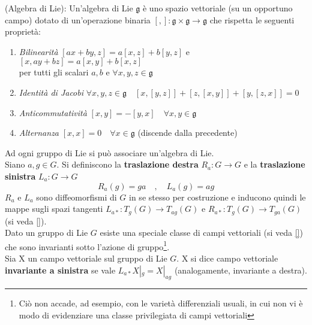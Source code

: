 \begin{definition}{(Algebra di Lie):}\label{def:LieAlgebra}
   Un'algebra di Lie $\mathfrak{g}$ è uno spazio vettoriale (su un opportuno campo)
   dotato di un'operazione binaria $[,] : \mathfrak{g} \times \mathfrak{g} \to \mathfrak{g}$
   che rispetta le seguenti proprietà:
   \begin{enumerate}
       \item \emph{Bilinearità} \quad $[ax+by,z] = a[x,z]+b[y,z]$ \quad e \quad
          $[x,ay+bz] = a[x,y] + b[x,z]$ \\
          per tutti gli scalari $a,b$ e $\forall x,y,z \in \mathfrak{g}$
       \item \emph{Identità di Jacobi} \quad $\forall x,y,z \in \mathfrak{g} \quad
          [x,[y,z]] + [z,[x,y]] + [y,[z,x]] = 0$
       \item \emph{Anticommutatività} \quad $[x,y] = -[y,x] \quad
          \forall x,y \in \mathfrak{g} $
       \item \emph{Alternanza} \quad $[x,x]=0 \quad \forall x \in \mathfrak{g}$ \quad
          (discende dalla precedente)
   \end{enumerate}
\end{definition}


Ad ogni gruppo di Lie si può associare un'algebra di Lie.\\

Siano $a,g \in G$. Si definiscono la \textbf{traslazione destra} $R_a : G \to G$
e la \textbf{traslazione sinistra} $L_a : G \to G$
$$
   R_a(g) = ga \quad,\quad L_a(g) = ag
$$
$R_a$ e $L_a$ sono diffeomorfismi di $G$ in se stesso per costruzione e inducono
quindi le mappe sugli spazi tangenti $L_{a*} : T_g(G) \to T_{ag}(G)$ e
$R_{a*} : T_g(G) \to T_{ga}(G)$ (si veda \ref{}).\\

Dato un gruppo di Lie $G$ esiste una speciale classe di campi vettoriali
(si veda \ref{}) che sono invarianti sotto l'azione di gruppo\footnote{
Ciò non accade, ad esempio, con le varietà differenziali usuali, in cui non vi è
modo di evidenziare una classe privilegiata di campi vettoriali
}.\\

Sia X un campo vettoriale sul gruppo di Lie $G$. X si dice campo vettoriale
\textbf{invariante a sinistra} se vale $L_{a*}X|_g = X|_{ag}$ (analogamente,
invariante a destra).\\

